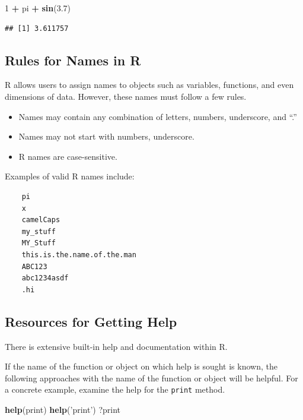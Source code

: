 \documentclass[]{article}
\newenvironment{Shaded}{\begin{snugshade}}{\end{snugshade}}
\newcommand{\KeywordTok}[1]{\textcolor[rgb]{0.13,0.29,0.53}{\textbf{#1}}}
\newcommand{\DecValTok}[1]{\textcolor[rgb]{0.00,0.00,0.81}{#1}}
\newcommand{\FloatTok}[1]{\textcolor[rgb]{0.00,0.00,0.81}{#1}}
\newcommand{\StringTok}[1]{\textcolor[rgb]{0.31,0.60,0.02}{#1}}
\newcommand{\OperatorTok}[1]{\textcolor[rgb]{0.81,0.36,0.00}{\textbf{#1}}}
\newcommand{\NormalTok}[1]{#1}
\providecommand{\tightlist}{%
  \setlength{\itemsep}{0pt}\setlength{\parskip}{0pt}}
\theoremstyle{definition}
\theoremstyle{definition}
\theoremstyle{remark}
\begin{document}
\begin{Shaded}
\begin{Highlighting}[]
\DecValTok{1} \OperatorTok{+}\StringTok{ }\NormalTok{pi }\OperatorTok{+}
\KeywordTok{sin}\NormalTok{(}\FloatTok{3.7}\NormalTok{)}
\end{Highlighting}
\end{Shaded}

\begin{verbatim}
## [1] 3.611757
\end{verbatim}

\subsection{Rules for Names in R}\label{rules-for-names-in-r}

R allows users to assign names to objects such as variables, functions,
and even dimensions of data. However, these names must follow a few
rules.

\begin{itemize}
\tightlist
\item
  Names may contain any combination of letters, numbers, underscore, and
  ``.''
\item
  Names may not start with numbers, underscore.
\item
  R names are case-sensitive.
\end{itemize}

Examples of valid R names include:

\begin{verbatim}
    pi
    x
    camelCaps
    my_stuff
    MY_Stuff
    this.is.the.name.of.the.man
    ABC123
    abc1234asdf
    .hi
\end{verbatim}

\subsection{Resources for Getting
Help}\label{resources-for-getting-help}

There is extensive built-in help and documentation within R.

If the name of the function or object on which help is sought is known,
the following approaches with the name of the function or object will be
helpful. For a concrete example, examine the help for the \texttt{print}
method.

\begin{Shaded}
\begin{Highlighting}[]
\KeywordTok{help}\NormalTok{(print)}
\KeywordTok{help}\NormalTok{(}\StringTok{'print'}\NormalTok{)}
\NormalTok{?print}
\end{Highlighting}
\end{Shaded}
\end{document}
